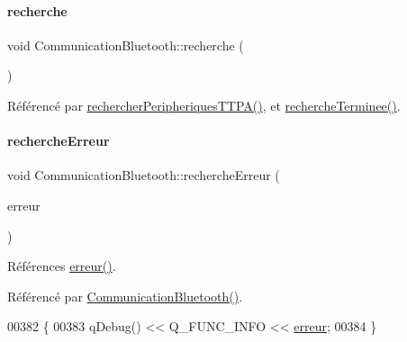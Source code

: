 \paragraph{\texorpdfstring{recherche}{recherche}}
{\footnotesize\ttfamily void Communication\+Bluetooth\+::recherche (\begin{DoxyParamCaption}{ }\end{DoxyParamCaption})\hspace{0.3cm}{\ttfamily [signal]}}



Référencé par \hyperlink{class_communication_bluetooth_a4c2e2d557728c227faeb247cb8a9c482}{rechercher\+Peripheriques\+T\+T\+P\+A()}, et \hyperlink{class_communication_bluetooth_a79ee5a5bcaaf265048f1213b5504f146}{recherche\+Terminee()}.

\mbox{\label{class_communication_bluetooth_ad9abca9e2e3fa0115cc92458a357e04d}} 
\paragraph{\texorpdfstring{recherche\+Erreur}{rechercheErreur}}
{\footnotesize\ttfamily void Communication\+Bluetooth\+::recherche\+Erreur (\begin{DoxyParamCaption}\item[{Q\+Bluetooth\+Device\+Discovery\+Agent\+::\+Error}]{erreur }\end{DoxyParamCaption})\hspace{0.3cm}{\ttfamily [slot]}}



Références \hyperlink{class_communication_bluetooth_a90c5c3c42145bad0f80a7a75d98dc253}{erreur()}.



Référencé par \hyperlink{class_communication_bluetooth_ae1c3be7b0a32ee1142d958bad3d7c571}{Communication\+Bluetooth()}.


\begin{DoxyCode}
00382 \{
00383     qDebug() << Q\_FUNC\_INFO << \hyperlink{class_communication_bluetooth_a90c5c3c42145bad0f80a7a75d98dc253}{erreur};
00384 \}
\end{DoxyCode}
\mbox{\label{class_communication_bluetooth_a4c2e2d557728c227faeb247cb8a9c482}} 
